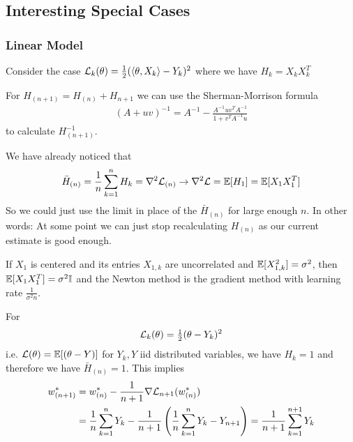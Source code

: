 \subsection{Interesting Special Cases}

\subsubsection{Linear Model}

Consider the case \(\mathcal{L}_k(\theta) = \tfrac12(\langle \theta, X_k\rangle - Y_k)^2\)
where we have \(H_k = X_k X_k^T\)

\begin{example}
	For \(H_{(n+1)} = H_{(n)} + H_{n+1}\) we can use the Sherman-Morrison formula
	\begin{align*}
		(A + uv)^{-1} = A^{-1} - \frac{A^{-1}uv^T A^{-1}}{1+ v^T A^{-1}u}
	\end{align*}
	to calculate \(H_{(n+1)}^{-1}\).
\end{example}

\begin{example}
	We have already noticed that
	\begin{align*}
		\bar{H}_{(n)} = \frac1n\sum_{k=1}^n H_k = \nabla^2\mathcal{L}_{(n)}
		\to \nabla^2\mathcal{L} = \mathbb{E}[H_1]=\mathbb{E}[X_1X_1^T]
	\end{align*}
	So we could just use the limit in place of the \(\bar{H}_{(n)}\) for large
	enough \(n\). In other words: At some point we can just stop recalculating
	\(H_{(n)}\) as our current estimate is good enough.
\end{example}

\begin{example}
	If \(X_1\) is centered and its entries \(X_{1,k}\) are uncorrelated and
	\(\mathbb{E}[X_{1,k}^2]=\sigma^2\), then \(\mathbb{E}[X_1X_1^T]=\sigma^2\mathbb{I}\) and
	the Newton method is the gradient method with learning rate
	\(\frac{1}{\sigma^2n}\). 
\end{example}

\begin{example}
	For
	\begin{align}
		\mathcal{L}_k(\theta) = \tfrac12(\theta - Y_k)^2
	\end{align}	
	i.e. \(\mathcal{L}(\theta) = \mathbb{E}[(\theta - Y)]\) for \(Y_k, Y\) iid distributed
	variables, we have \(H_k = 1\) and therefore we have \(\bar{H}_{(n)}=1\).
	This implies
	\begin{align*}
		w^*_{(n+1)}
		&= w^*_{(n)} - \frac1{n+1}\nabla\mathcal{L}_{n+1}(w^*_{(n)})\\
		&= \frac1n\sum_{k=1}^n Y_k - \frac1{n+1}\left(\frac1n\sum_{k=1}^n Y_k - Y_{n+1}\right)
		= \frac1{n+1}\sum_{k=1}^{n+1} Y_k
	\end{align*}
\end{example}